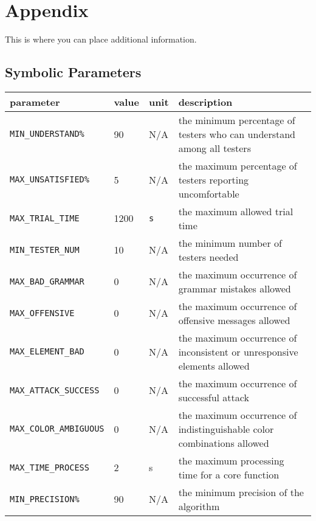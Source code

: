 \documentclass[12pt, titlepage]{article}
\begin{document}
\begin{enumerate}
\begin{itemize}
\end{itemize}
\section{Appendix}

This is where you can place additional information.

\subsection{Symbolic Parameters}

\begin{longtable}{|l|l|l|p{5cm}|}

\hline
parameter & value & unit & description\\
\hline
\texttt{MIN\_UNDERSTAND\%}\label{MIN_UNDERSTAND} & 90 & N/A & the minimum percentage of testers who can understand among all testers\\
\hline
\texttt{MAX\_UNSATISFIED\%}\label{MAX_UNSATISFIED} & 5 & N/A & the maximum percentage of testers reporting uncomfortable\\
\hline
\texttt{MAX\_TRIAL\_TIME}\label{MAX_TRIAL_TIME} & 1200 & \texttt{s} & the maximum allowed trial time\\
\hline
\texttt{MIN\_TESTER\_NUM}\label{MIN_TESTER_NUM} &  10 & N/A & the minimum number of testers needed\\
\hline
\texttt{MAX\_BAD\_GRAMMAR}\label{MAX_BAD_GRAMMAR} & 0 & N/A & the maximum occurrence of grammar mistakes allowed \\
\hline
\texttt{MAX\_OFFENSIVE}\label{MAX_OFFENSIVE} & 0& N/A & the maximum occurrence of offensive messages allowed\\
\hline
\texttt{MAX\_ELEMENT\_BAD}\label{MAX_ELEMENT_BAD} & 0& N/A & the maximum occurrence of inconsistent 
 or unresponsive elements allowed\\
\hline
\texttt{MAX\_ATTACK\_SUCCESS}\label{MAX_ATTACK_SUCCESS} & 0& N/A & the maximum occurrence of successful attack\\
\hline
\texttt{MAX\_COLOR\_AMBIGUOUS}\label{MAX_COLOR_AMBIGUOUS} & 0& N/A & the maximum occurrence of indistinguishable color combinations allowed\\
\hline
\texttt{MAX\_TIME\_PROCESS}\label{MAX_TIME_PROCESS} & 2& s & the maximum processing time for a core function\\
\hline
\texttt{MIN\_PRECISION\%}\label{MIN_PRECISION} & 90 & N/A & the minimum precision of the algorithm\\

\end{longtable}
\end{enumerate}
\end{document}
